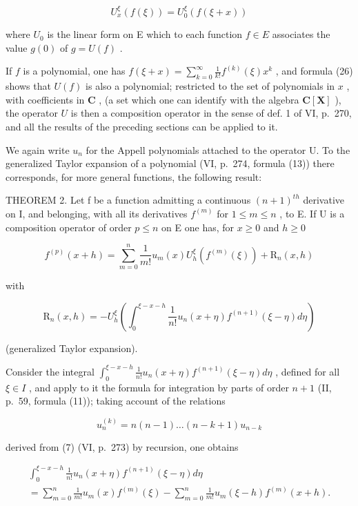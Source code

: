 \[
U _ {x} ^ {\xi} (f (\xi)) = U _ {0} ^ {\xi} (f (\xi + x))\tag{26}
\]

where \(U_{0}\) is the linear form on E which to each function \(f \in E\) associates the value \(g(0)\) of \(g = U(f)\) .

If \(f\) is a polynomial, one has \(f(\xi + x) = \sum_{k=0}^{\infty} \frac{1}{k!} f^{(k)}(\xi)x^k\) , and formula (26) shows that \(U(f)\) is also a polynomial; restricted to the set of polynomials in \(x\) , with coefficients in \(\mathbf{C}\) , (a set which one can identify with the algebra \(\mathbf{C}[\mathbf{X}]\) ), the operator \(U\) is then a composition operator in the sense of def. 1 of VI, p.~270, and all the results of the preceding sections can be applied to it.

We again write \(u_{n}\) for the Appell polynomials attached to the operator U. To the generalized Taylor expansion of a polynomial (VI, p.~274, formula (13)) there corresponds, for more general functions, the following result:

THEOREM 2. Let f be a function admitting a continuous \((n+1)^{th}\) derivative on I, and belonging, with all its derivatives \(f^{(m)}\) for \(1 \leqslant m \leqslant n\) , to E. If U is a composition operator of order \(p \leqslant n\) on E one has, for \(x \geqslant 0\) and \(h \geqslant 0\)

\[
f ^ {(p)} (x + h) = \sum_ {m = 0} ^ {n} \frac {1}{m !} u _ {m} (x) U _ {h} ^ {\xi} \left(f ^ {(m)} (\xi)\right) + \mathrm{R} _ {n} (x, h)\tag{27}
\]

with

\[
\mathrm{R} _ {n} (x, h) = - U _ {h} ^ {\xi} \left(\int_ {0} ^ {\xi - x - h} \frac {1}{n !} u _ {n} (x + \eta) f ^ {(n + 1)} (\xi - \eta) d \eta\right)\tag{28}
\]

(generalized Taylor expansion).

Consider the integral \(\int_{0}^{\xi-x-h}\frac{1}{n!}u_{n}(x+\eta)f^{(n+1)}(\xi-\eta)d\eta\) , defined for all \(\xi\in I\) , and apply to it the formula for integration by parts of order \(n+1\) (II, p.~59, formula (11)); taking account of the relations

\[
u _ {n} ^ {(k)} = n (n - 1) \dots (n - k + 1) u _ {n - k}
\]

derived from (7) (VI, p.~273) by recursion, one obtains

\[
\begin{array}{l} \int_ {0} ^ {\xi - x - h} \frac {1}{n !} u _ {n} (x + \eta) f ^ {(n + 1)} (\xi - \eta) d \eta \\ = \sum_ {m = 0} ^ {n} \frac {1}{m !} u _ {m} (x) f ^ {(m)} (\xi) - \sum_ {m = 0} ^ {n} \frac {1}{m !} u _ {m} (\xi - h) f ^ {(m)} (x + h). \end{array}\tag{29}
\]

